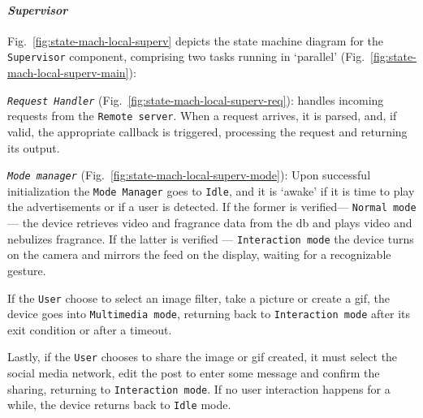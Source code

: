 \paragraph{\emph{Supervisor}}
Fig.~\ref{fig:state-mach-local-superv} depicts the state machine diagram for the
\texttt{Supervisor} component, comprising two tasks running in
`parallel' (Fig.~\ref{fig:state-mach-local-superv-main}):
\begin{item-c}
%
\item \emph{\texttt{Request Handler}} (Fig.~\ref{fig:state-mach-local-superv-req}): handles incoming requests from the
  \texttt{Remote server}. When a request arrives, it is parsed, and, if valid,
  the appropriate callback is triggered, processing the request and returning
  its output.
%  
\item \emph{\texttt{Mode manager}} (Fig.~\ref{fig:state-mach-local-superv-mode}): Upon successful initialization the
  \texttt{Mode Manager} goes to \texttt{Idle}, and it is `awake' if it is time
  to play the advertisements or if a user is detected. If the former is
  verified--- \texttt{Normal mode} --- the device retrieves video
  and fragrance data from the \gls{db} and plays video and nebulizes
  fragrance. If the latter is verified --- \texttt{Interaction mode} the device
  turns on the camera and mirrors the feed on the display, waiting for a
  recognizable gesture.

  If the \texttt{User} choose to select an image filter,
  take a picture or create a \gls{gif}, the device goes into \texttt{Multimedia
    mode}, returning back to \texttt{Interaction mode} after its exit condition
  or after a timeout.

  Lastly, if the \texttt{User} chooses to share the image or
  \gls{gif} created, it must select the social media network, edit the post to
  enter some message and confirm the sharing, returning to \texttt{Interaction
    mode}. If no user interaction happens for a while, the device returns back
  to \texttt{Idle} mode.
%
\end{item-c}
%
%
